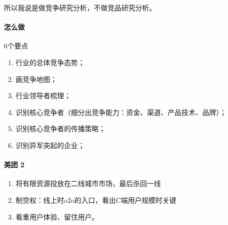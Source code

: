\documentclass[letterpaper,11pt,english]{sphinxmanual}
\begin{document}
所以我说是做竞争研究分析，不做竞品研究分析。


\paragraph{怎么做}
\label{\detokenize{chapter_skill/compete_analysis:id4}}
6个要点
\begin{enumerate}
%
\item {} 
行业的总体竞争态势；

\item {} 
画竞争地图；

\item {} 
行业领导者梳理；

\item {} 
识别核心竞争者（细分出竞争能力：资金、渠道、产品技术、品牌）；

\item {} 
识别核心竞争者的传播策略；

\item {} 
识别异军突起的企业；

\end{enumerate}


\paragraph{美团 2\sphinxfootnotemark[172]}
\label{\detokenize{chapter_skill/compete_analysis:id5}}%
\begin{footnotetext}[172]\sphinxAtStartFootnote
{}
%
\end{footnotetext}\ignorespaces \begin{enumerate}
%
\item {} 
将有限资源投放在二线城市市场，最后杀回一线

\item {} 
制空权：线上时o2o的入口，看出C端用户规模时关键

\item {} 
看重用户体验、留住用户。

\end{enumerate}
\end{document}
